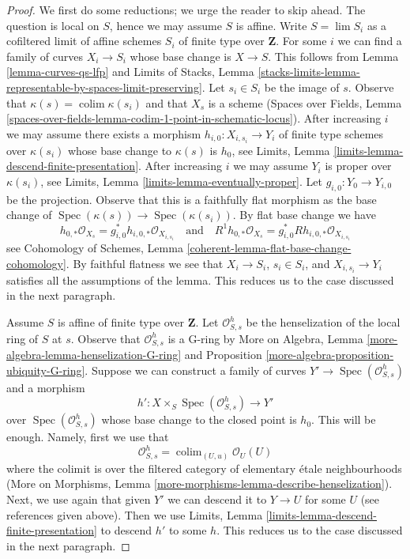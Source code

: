 \documentclass{stacks-project}
\theoremstyle{plain}
\theoremstyle{definition}
\theoremstyle{remark}
\numberwithin{equation}{subsection}
\def\lim{\mathop{\mathrm{lim}}\nolimits}
\def\colim{\mathop{\mathrm{colim}}\nolimits}
\def\Spec{\mathop{\mathrm{Spec}}}
\begin{document}
\begin{proof}
We first do some reductions; we urge the reader to skip ahead.
The question is local on $S$, hence we may assume $S$ is affine.
Write $S = \lim S_i$ as a cofiltered limit of affine schemes $S_i$
of finite type over $\mathbf{Z}$.
For some $i$ we can find a family of curves $X_i \to S_i$
whose base change is $X \to S$. This follows from
Lemma \ref{lemma-curves-qs-lfp} and
Limits of Stacks, Lemma
\ref{stacks-limits-lemma-representable-by-spaces-limit-preserving}.
Let $s_i \in S_i$ be the image of $s$. Observe that
$\kappa(s) = \colim \kappa(s_i)$ and that $X_s$ is a scheme
(Spaces over Fields, Lemma
\ref{spaces-over-fields-lemma-codim-1-point-in-schematic-locus}).
After increasing $i$ we may assume there exists a morphism
$h_{i, 0} : X_{i, s_i} \to Y_i$
of finite type schemes over $\kappa(s_i)$ whose base change to
$\kappa(s)$ is $h_0$, see
Limits, Lemma \ref{limits-lemma-descend-finite-presentation}.
After increasing $i$ we may assume $Y_i$ is proper over $\kappa(s_i)$, see
Limits, Lemma \ref{limits-lemma-eventually-proper}.
Let $g_{i, 0} : Y_0 \to Y_{i, 0}$ be the projection. Observe that
this is a faithfully flat morphism as the base change of
$\Spec(\kappa(s)) \to \Spec(\kappa(s_i))$.
By flat base change we have
$$
h_{0, *}\mathcal{O}_{X_s} = g_{i, 0}^*h_{i, 0, *}\mathcal{O}_{X_{i, s_i}}
\quad\text{and}\quad
R^1h_{0, *}\mathcal{O}_{X_s} = g_{i, 0}^*Rh_{i, 0, *}\mathcal{O}_{X_{i, s_i}}
$$
see Cohomology of Schemes, Lemma
\ref{coherent-lemma-flat-base-change-cohomology}.
By faithful flatness we see that $X_i \to S_i$, $s_i \in S_i$, and
$X_{i, s_i} \to Y_i$ satisfies all the assumptions of the lemma.
This reduces us to the case discussed in the next paragraph.

\medskip\noindent
Assume $S$ is affine of finite type over $\mathbf{Z}$.
Let $\mathcal{O}_{S, s}^h$ be the henselization of the local
ring of $S$ at $s$. Observe that $\mathcal{O}_{S, s}^h$ is a G-ring by
More on Algebra, Lemma \ref{more-algebra-lemma-henselization-G-ring} and
Proposition \ref{more-algebra-proposition-ubiquity-G-ring}.
Suppose we can construct a family of curves
$Y' \to \Spec(\mathcal{O}_{S, s}^h)$ and a morphism
$$
h' : X \times_S \Spec(\mathcal{O}_{S, s}^h) \longrightarrow Y'
$$
over $\Spec(\mathcal{O}_{S, s}^h)$ whose base change to the closed
point is $h_0$. This will be enough. Namely, first we use that
$$
\mathcal{O}_{S, s}^h = \colim_{(U, u)} \mathcal{O}_U(U)
$$
where the colimit is over the filtered category of 
elementary \'etale neighbourhoods (More on Morphisms, Lemma
\ref{more-morphisms-lemma-describe-henselization}).
Next, we use again that given $Y'$ we can descend it to
$Y \to U$ for some $U$ (see references given above).
Then we use
Limits, Lemma \ref{limits-lemma-descend-finite-presentation}
to descend $h'$ to some $h$. This reduces us to the case
discussed in the next paragraph.


\end{proof}
\end{document}
